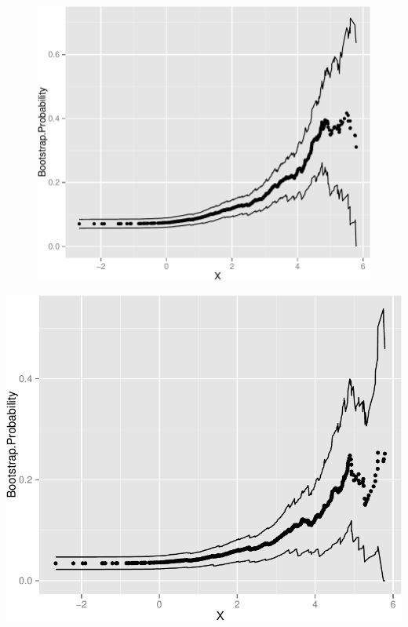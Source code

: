 \documentclass[11pt,]{article}
\begin{document}
\begin{figure}[htbp]
\centering
\includegraphics{manuscript_files/figure-latex/who_rec_low1_cp-1.pdf}
\caption{}
\end{figure}

\newpage

\includegraphics{manuscript_files/figure-latex/who_rec_low2_cp-1.pdf}
\newpage
\end{document}
